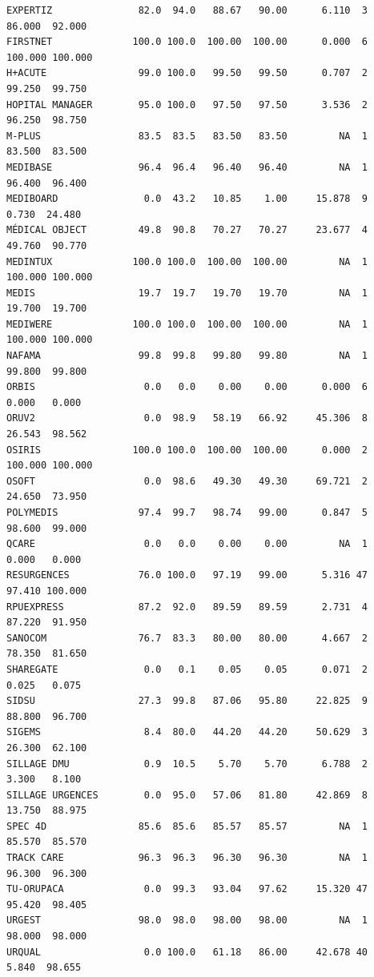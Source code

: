 \documentclass[]{article}
\begin{document}
\begin{verbatim}
EXPERTIZ               82.0  94.0   88.67   90.00      6.110  3  86.000  92.000
FIRSTNET              100.0 100.0  100.00  100.00      0.000  6 100.000 100.000
H+ACUTE                99.0 100.0   99.50   99.50      0.707  2  99.250  99.750
HOPITAL MANAGER        95.0 100.0   97.50   97.50      3.536  2  96.250  98.750
M-PLUS                 83.5  83.5   83.50   83.50         NA  1  83.500  83.500
MEDIBASE               96.4  96.4   96.40   96.40         NA  1  96.400  96.400
MEDIBOARD               0.0  43.2   10.85    1.00     15.878  9   0.730  24.480
MÉDICAL OBJECT         49.8  90.8   70.27   70.27     23.677  4  49.760  90.770
MEDINTUX              100.0 100.0  100.00  100.00         NA  1 100.000 100.000
MEDIS                  19.7  19.7   19.70   19.70         NA  1  19.700  19.700
MEDIWERE              100.0 100.0  100.00  100.00         NA  1 100.000 100.000
NAFAMA                 99.8  99.8   99.80   99.80         NA  1  99.800  99.800
ORBIS                   0.0   0.0    0.00    0.00      0.000  6   0.000   0.000
ORUV2                   0.0  98.9   58.19   66.92     45.306  8  26.543  98.562
OSIRIS                100.0 100.0  100.00  100.00      0.000  2 100.000 100.000
OSOFT                   0.0  98.6   49.30   49.30     69.721  2  24.650  73.950
POLYMEDIS              97.4  99.7   98.74   99.00      0.847  5  98.600  99.000
QCARE                   0.0   0.0    0.00    0.00         NA  1   0.000   0.000
RESURGENCES            76.0 100.0   97.19   99.00      5.316 47  97.410 100.000
RPUEXPRESS             87.2  92.0   89.59   89.59      2.731  4  87.220  91.950
SANOCOM                76.7  83.3   80.00   80.00      4.667  2  78.350  81.650
SHAREGATE               0.0   0.1    0.05    0.05      0.071  2   0.025   0.075
SIDSU                  27.3  99.8   87.06   95.80     22.825  9  88.800  96.700
SIGEMS                  8.4  80.0   44.20   44.20     50.629  3  26.300  62.100
SILLAGE DMU             0.9  10.5    5.70    5.70      6.788  2   3.300   8.100
SILLAGE URGENCES        0.0  95.0   57.06   81.80     42.869  8  13.750  88.975
SPEC 4D                85.6  85.6   85.57   85.57         NA  1  85.570  85.570
TRACK CARE             96.3  96.3   96.30   96.30         NA  1  96.300  96.300
TU-ORUPACA              0.0  99.3   93.04   97.62     15.320 47  95.420  98.405
URGEST                 98.0  98.0   98.00   98.00         NA  1  98.000  98.000
URQUAL                  0.0 100.0   61.18   86.00     42.678 40   5.840  98.655
\end{verbatim}
\end{document}
